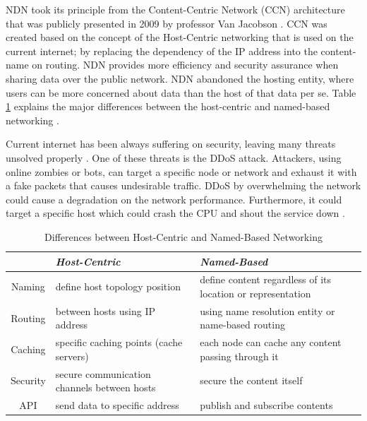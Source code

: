\documentclass[conference]{IEEEtran}
\begin{document}
NDN took its principle from the Content-Centric Network (CCN) architecture that was publicly presented in 2009 by professor Van Jacobson \cite{Jacobson:2009:NNC:1658939.1658941}\cite{Jacobson2012}\cite{Fukuda2009}. CCN was created based on the concept of the Host-Centric networking that is used on the current internet; by replacing the dependency of the IP address into the content-name on routing. NDN provides more efficiency and security assurance when sharing data over the public network. NDN abandoned the hosting entity, where users can be more concerned about data than the host of that data per se. Table \ref{tab1} explains the major differences between the host-centric and named-based networking \cite{Abdallah2015}. 

Current internet has been always suffering on security, leaving many threats unsolved properly \cite{Smetters2009}. One of these threats is the DDoS attack. Attackers, using online zombies or bots, can target a specific node or network and exhaust it with a fake packets that causes undesirable traffic. DDoS by overwhelming the network could cause a degradation on the network performance. Furthermore, it could target a specific host which could crash the CPU and shout the service down \cite{6496396}.

\begin{table}[htbp]
\caption{Differences between Host-Centric and Named-Based Networking}
\begin{center}
\begin{tabular}{|c|p{3cm}|p{3.5cm}|}
\hline
{}&\textbf{\textit{Host-Centric}}& \textbf{\textit{Named-Based}} \\
\hline
{Naming}& define host topology position & define content regardless of its location or representation \\
\hline
{Routing}& between hosts using IP address & using name resolution entity or name-based routing  \\
\hline
{Caching}& specific caching points (cache servers) & each node can cache any content passing through it   \\
\hline
{Security}& secure communication channels between hosts & secure the content itself   \\
\hline
{API}& send data to specific address & publish and subscribe contents  \\
\hline
\end{tabular}
\label{tab1}
\end{center}
\end{table}
\end{document}
